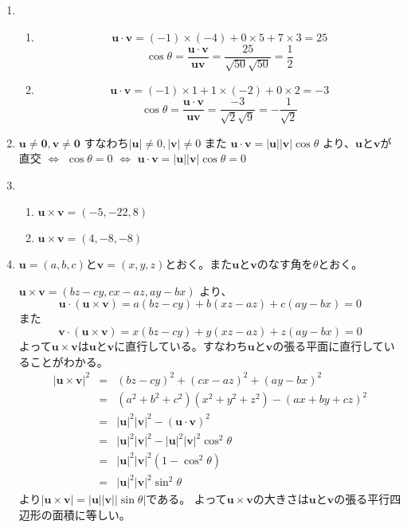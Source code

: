 \documentclass{jarticle}
\begin{document}
\begin{enumerate}
  \item
    \begin{enumerate}
      \item 
        \[ \bm u \cdot \bm v = (-1) \times (-4) + 0 \times 5 + 7 \times 3 = 25 \]
        \[ \cos \theta = \frac { \bm u \cdot \bm v } { \bm u \bm v } = \frac { 25 } { \sqrt{50} \sqrt{50} } = \frac{1}{2} \]
      \item
        \[ \bm u \cdot \bm v = (-1) \times 1 + 1 \times (-2) + 0 \times 2 = -3\] 
        \[ \cos \theta = \frac { \bm u \cdot \bm v } { \bm u \bm v } = \frac { -3 } { \sqrt 2 \sqrt 9 } = - \frac { 1 } { \sqrt 2 } \]
    \end{enumerate}
  \item
    $\bm u \neq \bm 0, \bm v \neq \bm 0$ すなわち$|\bm u| \neq 0, |\bm v| \neq 0$ また $\bm u \cdot \bm v = |\bm u| |\bm v| \cos \theta$ より、$\bm u$と$\bm v$が直交 $\Leftrightarrow$ $\cos \theta = 0$ $\Leftrightarrow$ $\bm u \cdot \bm v = |\bm u| |\bm v| \cos \theta = 0$
  \item
    \begin{enumerate}
      \item $\bm u \times \bm v = (-5,-22,8)$
      \item $\bm u \times \bm v = (4,-8,-8)$
    \end{enumerate}
  
  \item
    $\bm u = (a,b,c)$と$\bm v=(x,y,z)$とおく。また$\bm u$と$\bm v$のなす角を$\theta$とおく。
    
    $\bm u \times \bm v = (bz-cy,cx-az,ay-bx)$ より、
    \[ \bm u \cdot (\bm u \times \bm v) = a(bz-cy)+b(xz-az)+c(ay-bx) = 0\]
    また
    \[ \bm v \cdot (\bm u \times \bm v) = x(bz-cy)+y(xz-az)+z(ay-bx) = 0\]
    よって$\bm u \times \bm v$は$\bm u$と$\bm v$に直行している。すなわち$\bm u$と$\bm v$の張る平面に直行していることがわかる。
    \begin{eqnarray*}
      |\bm u \times \bm v|^2 & = & (bz-cy)^2+(cx-az)^2+(ay-bx)^2 \\
      & = & (a^2+b^2+c^2)(x^2+y^2+z^2) - (ax+by+cz)^2 \\
      & = & |\bm u|^2 |\bm v|^2 - (\bm u \cdot \bm v)^2 \\ 
      & = & |\bm u|^2 |\bm v|^2 - |\bm u|^2 |\bm v|^2 \cos^2 \theta \\
      & = & |\bm u|^2 |\bm v|^2 ( 1 - \cos^2 \theta) \\
      & = & |\bm u|^2 |\bm v|^2 \sin^2 \theta
    \end{eqnarray*}
    より$|\bm u \times \bm v| = |\bm u||\bm v| |\sin \theta|$である。
    よって$\bm u \times \bm v$の大きさは$\bm u$と$\bm v$の張る平行四辺形の面積に等しい。
    

\end{enumerate}
\end{document}
